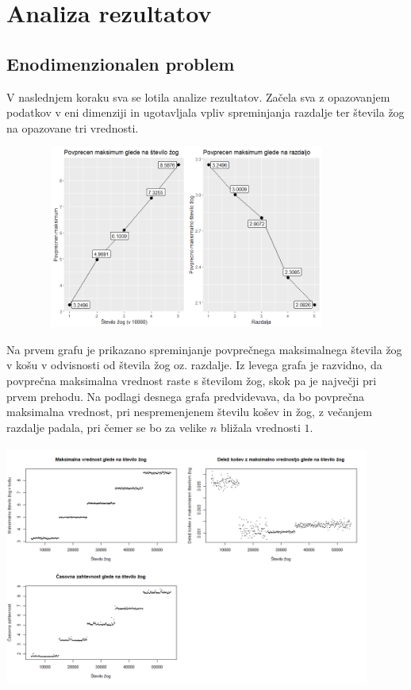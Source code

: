 \documentclass[a4paper, 11pt]{article}
\begin{document}
\section{Analiza rezultatov}
\subsection{Enodimenzionalen problem}
V naslednjem koraku sva se lotila analize rezultatov. Začela sva z opazovanjem podatkov v eni dimenziji in ugotavljala vpliv spreminjanja razdalje ter števila žog na opazovane tri vrednosti.
\bigbreak

\includegraphics[width=12cm, height=6cm]{povprecje_1dim1.png}

Na prvem grafu je prikazano spreminjanje povprečnega maksimalnega števila žog v košu v odvisnosti od števila žog oz. razdalje.
Iz levega grafa je razvidno, da povprečna maksimalna vrednost raste s številom žog, skok pa je največji pri prvem prehodu.
Na podlagi desnega grafa predvidevava, da bo povprečna maksimalna vrednost, pri nespremenjenem številu košev in žog, z večanjem razdalje padala, pri čemer se bo za velike $n$ bližala vrednosti $1$.
\bigbreak


\includegraphics[width=12cm, height=8cm]{dim1_glede_na_stevilo_zog2.png}
\end{document}
